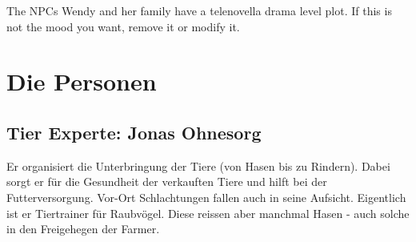 The NPCs Wendy and her family have a telenovella drama level plot. If this is not the mood you want, remove it or modify it.

\chapter{Die Personen}

\section{Tier Experte: Jonas Ohnesorg}

Er organisiert die Unterbringung der Tiere (von Hasen bis zu Rindern). Dabei sorgt er für die Gesundheit der verkauften Tiere und hilft bei der Futterversorgung. Vor-Ort Schlachtungen fallen auch in seine Aufsicht. Eigentlich ist  er Tiertrainer für Raubvögel. Diese reissen aber manchmal Hasen - auch solche in den Freigehegen der Farmer.

